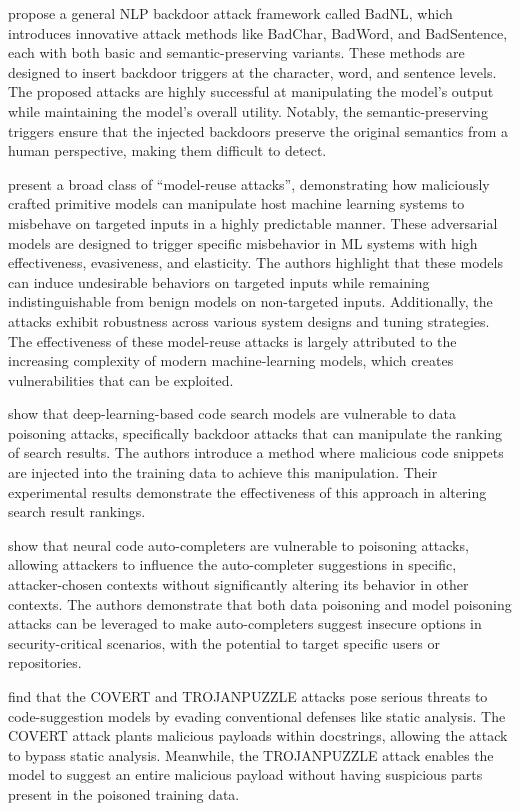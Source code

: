 \cite{Chen2020BadNLBA} propose a general NLP backdoor attack framework called BadNL, which introduces innovative attack methods like BadChar, BadWord, and BadSentence, each with both basic and semantic-preserving variants. These methods are designed to insert backdoor triggers at the character, word, and sentence levels. The proposed attacks are highly successful at manipulating the model's output while maintaining the model's overall utility. Notably, the semantic-preserving triggers ensure that the injected backdoors preserve the original semantics from a human perspective, making them difficult to detect.


\cite{Ji2018ModelReuseAO} present a broad class of ``model-reuse attacks'', demonstrating how maliciously crafted primitive models can manipulate host machine learning systems to misbehave on targeted inputs in a highly predictable manner. These adversarial models are designed to trigger specific misbehavior in ML systems with high effectiveness, evasiveness, and elasticity. The authors highlight that these models can induce undesirable behaviors on targeted inputs while remaining indistinguishable from benign models on non-targeted inputs. Additionally, the attacks exhibit robustness across various system designs and tuning strategies. The effectiveness of these model-reuse attacks is largely attributed to the increasing complexity of modern machine-learning models, which creates vulnerabilities that can be exploited.



\cite{Wan2022YouSW} show that deep-learning-based code search models are vulnerable to data poisoning attacks, specifically backdoor attacks that can manipulate the ranking of search results. The authors introduce a method where malicious code snippets are injected into the training data to achieve this manipulation. Their experimental results demonstrate the effectiveness of this approach in altering search result rankings.


\cite{Schuster2020YouAM} show that neural code auto-completers are vulnerable to poisoning attacks, allowing attackers to influence the auto-completer suggestions in specific, attacker-chosen contexts without significantly altering its behavior in other contexts. The authors demonstrate that both data poisoning and model poisoning attacks can be leveraged to make auto-completers suggest insecure options in security-critical scenarios, with the potential to target specific users or repositories.


\cite{Aghakhani2023TrojanPuzzleCP} find that the COVERT and TROJANPUZZLE attacks pose serious threats to code-suggestion models by evading conventional defenses like static analysis. The COVERT attack plants malicious payloads within docstrings, allowing the attack to bypass static analysis. Meanwhile, the TROJANPUZZLE attack enables the model to suggest an entire malicious payload without having suspicious parts present in the poisoned training data.



